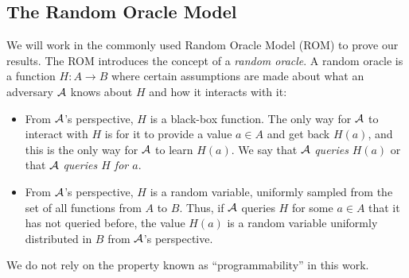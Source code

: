 \subsection{The Random Oracle Model}

We will work in the commonly used Random Oracle Model (ROM) to prove our results. The ROM introduces the concept of a \emph{random oracle}. A random oracle is a function $H : A \to B$ where certain assumptions are made about what an adversary $\mathcal{A}$ knows about $H$ and how it interacts with it:
\begin{itemize}
	\item From $\mathcal{A}$'s perspective, $H$ is a black-box function. The only way for $\mathcal{A}$ to interact with $H$ is for it to provide a value $a \in A$ and get back $H(a)$, and this is the only way for $\mathcal{A}$ to learn $H(a)$. We say that $\mathcal{A}$ \emph{queries} $H(a)$ or that $\mathcal{A}$ \emph{queries $H$ for $a$}.
	\item From $\mathcal{A}$'s perspective, $H$ is a random variable, uniformly sampled from the set of all functions from $A$ to $B$. Thus, if $\mathcal{A}$ queries $H$ for some $a \in A$ that it has not queried before, the value $H(a)$ is a random variable uniformly distributed in $B$ from $\mathcal{A}$'s perspective.
\end{itemize}
We do not rely on the property known as ``programmability'' in this work.
